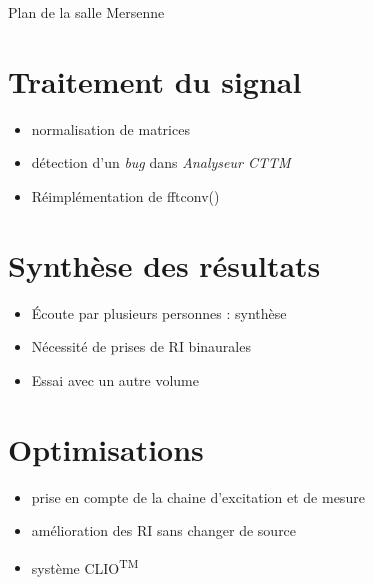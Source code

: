 \documentclass{beamer}
\begin{document}
\begin{frame}
\begin{figure}
\end{figure}
\begin{center}
Plan de la salle Mersenne
\end{center}
\end{frame}

\section{Traitement du signal}

\begin{frame}
\begin{itemize}
    \item normalisation de matrices
    \item détection d'un \textit{bug} dans \textit{Analyseur CTTM}
    \item Réimplémentation de fftconv()
\end{itemize}
\end{frame}

\section{Synthèse des résultats}

\begin{frame}
\begin{itemize}
    \item Écoute par plusieurs personnes : synthèse
    \item Nécessité de prises de RI binaurales
    \item Essai avec un autre volume
\end{itemize}
 \end{frame}

\section{Optimisations}

\begin{frame}
\begin{itemize}
    \item prise en compte de la chaine d'excitation et de mesure
    \item amélioration des RI sans changer de source
    \item système CLIO\textsuperscript{\textsc{TM}}
\end{itemize}
\end{frame}
\end{document}
